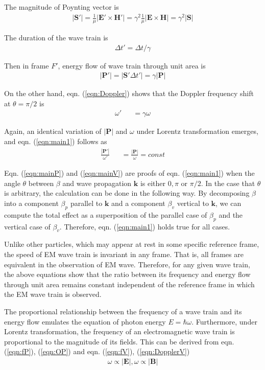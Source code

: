 \documentclass[prd,showpacs,twocolumn]{revtex4-1}
\begin{document}
The magnitude of Poynting vector is
\begin{eqnarray}
|\mathbf{S}'|=\frac{1}{\mu}|\mathbf{E}'\times\mathbf{H}'|=\gamma^2\frac{1}{\mu}|\mathbf{E}\times\mathbf{H}|=\gamma^2|\mathbf{S}|
\end{eqnarray}

The duration of the wave train is
\begin{eqnarray}
\Delta t'=\Delta t/\gamma
\label{eqn:tV}
\end{eqnarray}

Then in frame $F'$, energy flow of wave train through unit area is
\begin{eqnarray}
|\mathbf{P}'|=|\mathbf{S}'\Delta t'|=\gamma|\mathbf{P}|
\end{eqnarray}

On the other hand, eqn. (\ref{eqn:Doppler}) shows that the Doppler frequency shift at $\theta=\pi/2$ is
\begin{eqnarray}
\omega'&&=\gamma\omega
\label{eqn:DopplerV}
\end{eqnarray}

Again, an identical variation of $|\mathbf{P}|$ and $\omega$ under Lorentz transformation emerges, and eqn. (\ref{eqn:main1}) follows as
\begin{eqnarray}
\frac{|\mathbf{P}'|}{\omega'}&&=\frac{|\mathbf{P}|}{\omega}=const
\label{eqn:mainV}
\end{eqnarray}

Eqn. (\ref{eqn:mainP}) and (\ref{eqn:mainV}) are proofs of eqn. (\ref{eqn:main1}) when the angle $\theta$ between $\beta$ and wave propagation $\mathbf{k}$ is either $0, \pi$ or $\pi/2$. In the case that $\theta$ is arbitrary, the calculation can be done in the following way. By decomposing $\beta$ into a component $\beta_p$ parallel to $\mathbf{k}$ and a component $\beta_v$ vertical to $\mathbf{k}$, we can compute the total effect as a superposition of the parallel case of $\beta_p$ and the vertical case of $\beta_v$. Therefore, eqn. (\ref{eqn:main1}) holds true for all cases.

Unlike other particles, which may appear at rest in some specific reference frame, the speed of EM wave train is invariant in any frame. That is, all frames are equivalent in the observation of EM wave. Therefore, for any given wave train, the above equations show that the ratio between its frequency and energy flow through unit area remains constant independent of the reference frame in which the EM wave train is observed.

The proportional relationship between the frequency of a wave train and its energy flow emulates the equation of photon energy $E=\hbar\omega$. Furthermore, under Lorentz transformation, the frequency of an electromagnetic wave train is proportional to the magnitude of its fields. This can be derived from eqn. (\ref{eqn:fP}), (\ref{eqn:OP}) and eqn. (\ref{eqn:fV}), (\ref{eqn:DopplerV})
\begin{eqnarray}
\omega\propto|\mathbf{E}|, \omega\propto|\mathbf{B}|
\end{eqnarray}
\end{document}
